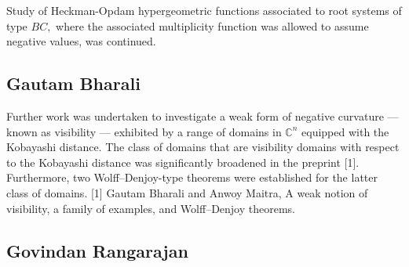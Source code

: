 Study of Heckman-Opdam hypergeometric functions associated to root systems of type $BC,$ where the associated multiplicity function was allowed to assume negative values, was continued.


\subsection{Gautam Bharali}

Further work was undertaken to investigate a weak form of negative curvature --- known as visibility --- exhibited by a range of domains in $\mathbb{C}^n$ equipped with the Kobayashi distance. The class of domains that are visibility domains with respect to the Kobayashi distance was significantly broadened in the preprint [1]. Furthermore, two Wolff--Denjoy-type theorems were established for the latter class of domains.  [1] Gautam Bharali and Anwoy Maitra, A weak notion of visibility, a family of examples, and Wolff--Denjoy theorems.


\subsection{Govindan Rangarajan}


